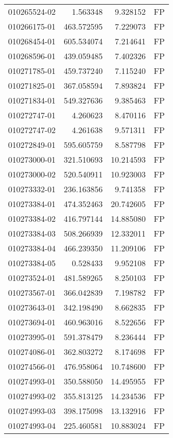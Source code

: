 \begin{tabular}{lrrl}
010265524-02 &    1.563348 &     9.328152 &   FP \\
010266175-01 &  463.572595 &     7.229073 &   FP \\
010268454-01 &  605.534074 &     7.214641 &   FP \\
010268596-01 &  439.059485 &     7.402326 &   FP \\
010271785-01 &  459.737240 &     7.115240 &   FP \\
010271825-01 &  367.058594 &     7.893824 &   FP \\
010271834-01 &  549.327636 &     9.385463 &   FP \\
010272747-01 &    4.260623 &     8.470116 &   FP \\
010272747-02 &    4.261638 &     9.571311 &   FP \\
010272849-01 &  595.605759 &     8.587798 &   FP \\
010273000-01 &  321.510693 &    10.214593 &   FP \\
010273000-02 &  520.540911 &    10.923003 &   FP \\
010273332-01 &  236.163856 &     9.741358 &   FP \\
010273384-01 &  474.352463 &    20.742605 &   FP \\
010273384-02 &  416.797144 &    14.885080 &   FP \\
010273384-03 &  508.266939 &    12.332011 &   FP \\
010273384-04 &  466.239350 &    11.209106 &   FP \\
010273384-05 &    0.528433 &     9.952108 &   FP \\
010273524-01 &  481.589265 &     8.250103 &   FP \\
010273567-01 &  366.042839 &     7.198782 &   FP \\
010273643-01 &  342.198490 &     8.662835 &   FP \\
010273694-01 &  460.963016 &     8.522656 &   FP \\
010273995-01 &  591.378479 &     8.236444 &   FP \\
010274086-01 &  362.803272 &     8.174698 &   FP \\
010274566-01 &  476.958064 &    10.748600 &   FP \\
010274993-01 &  350.588050 &    14.495955 &   FP \\
010274993-02 &  355.813125 &    14.234536 &   FP \\
010274993-03 &  398.175098 &    13.132916 &   FP \\
010274993-04 &  225.460581 &    10.883024 &   FP \\

\end{tabular}
